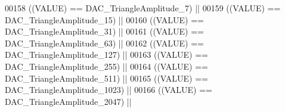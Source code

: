 \begin{DoxyCode}
00158                                                       \textcolor{preprocessor}{(}\textcolor{preprocessor}{(}\textcolor{preprocessor}{VALUE}\textcolor{preprocessor}{)} \textcolor{preprocessor}{==} 
      DAC_TriangleAmplitude_7\textcolor{preprocessor}{)} \textcolor{preprocessor}{||}
00159                                                       \textcolor{preprocessor}{(}\textcolor{preprocessor}{(}\textcolor{preprocessor}{VALUE}\textcolor{preprocessor}{)} \textcolor{preprocessor}{==} 
      DAC_TriangleAmplitude_15\textcolor{preprocessor}{)} \textcolor{preprocessor}{||}
00160                                                       \textcolor{preprocessor}{(}\textcolor{preprocessor}{(}\textcolor{preprocessor}{VALUE}\textcolor{preprocessor}{)} \textcolor{preprocessor}{==} 
      DAC_TriangleAmplitude_31\textcolor{preprocessor}{)} \textcolor{preprocessor}{||}
00161                                                       \textcolor{preprocessor}{(}\textcolor{preprocessor}{(}\textcolor{preprocessor}{VALUE}\textcolor{preprocessor}{)} \textcolor{preprocessor}{==} 
      DAC_TriangleAmplitude_63\textcolor{preprocessor}{)} \textcolor{preprocessor}{||}
00162                                                       \textcolor{preprocessor}{(}\textcolor{preprocessor}{(}\textcolor{preprocessor}{VALUE}\textcolor{preprocessor}{)} \textcolor{preprocessor}{==} 
      DAC_TriangleAmplitude_127\textcolor{preprocessor}{)} \textcolor{preprocessor}{||}
00163                                                       \textcolor{preprocessor}{(}\textcolor{preprocessor}{(}\textcolor{preprocessor}{VALUE}\textcolor{preprocessor}{)} \textcolor{preprocessor}{==} 
      DAC_TriangleAmplitude_255\textcolor{preprocessor}{)} \textcolor{preprocessor}{||}
00164                                                       \textcolor{preprocessor}{(}\textcolor{preprocessor}{(}\textcolor{preprocessor}{VALUE}\textcolor{preprocessor}{)} \textcolor{preprocessor}{==} 
      DAC_TriangleAmplitude_511\textcolor{preprocessor}{)} \textcolor{preprocessor}{||}
00165                                                       \textcolor{preprocessor}{(}\textcolor{preprocessor}{(}\textcolor{preprocessor}{VALUE}\textcolor{preprocessor}{)} \textcolor{preprocessor}{==} 
      DAC_TriangleAmplitude_1023\textcolor{preprocessor}{)} \textcolor{preprocessor}{||}
00166                                                       \textcolor{preprocessor}{(}\textcolor{preprocessor}{(}\textcolor{preprocessor}{VALUE}\textcolor{preprocessor}{)} \textcolor{preprocessor}{==} 
      DAC_TriangleAmplitude_2047\textcolor{preprocessor}{)} \textcolor{preprocessor}{||}

\end{DoxyCode}
